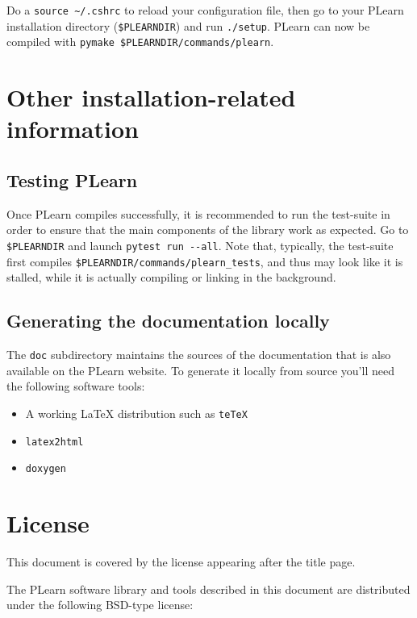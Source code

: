 \documentclass[11pt]{book}
\begin{document}
Do a \verb!source ~/.cshrc! to reload your configuration file, then go
to your PLearn installation directory (\verb!$PLEARNDIR!) and run \verb!./setup!. PLearn can now be compiled
with \verb!pymake $PLEARNDIR/commands/plearn!.



\chapter{Other installation-related information}

\section{Testing PLearn}

Once PLearn compiles successfully, it is recommended to run the test-suite
in order to ensure that the main components of the library work as expected.
Go to \verb!$PLEARNDIR! and launch \verb!pytest run --all!.
Note that, typically, the test-suite first compiles \verb!$PLEARNDIR/commands/plearn_tests!,
and thus may look like it is stalled, while it is actually compiling or linking
in the background.

\section{Generating the documentation locally}

The {\tt doc} subdirectory maintains the sources of the documentation that is also
available on the PLearn website. To generate it locally from source you'll
need the following software tools:
\begin{itemize}
\item A working LaTeX distribution such as {\tt teTeX}
\item {\tt latex2html}
\item {\tt doxygen}
\end{itemize}



\chapter*{License}

This document is covered by the license appearing after the title page.

\vspace*{.5cm}

The PLearn software library and tools described in this document are
distributed under the following BSD-type license:
\end{document}
